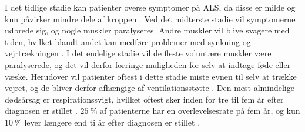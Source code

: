 \noindent
I det tidlige stadie kan patienter overse symptomer på ALS, da disse er milde og kun påvirker mindre dele af kroppen \citep{themusculardystrophyassociation2016}. 
Ved det midterste stadie vil symptomerne udbrede sig, og nogle muskler paralyseres. Andre muskler vil blive svagere med tiden, hvilket blandt andet kan medføre problemer med synkning og vejrtrækningen \citep{themusculardystrophyassociation2016}. I det endelige stadie vil de fleste voluntære muskler være paralyserede, og det vil derfor forringe muligheden for selv at indtage føde eller væske. 
Herudover vil patienter oftest i dette stadie miste evnen til selv at trække vejret, og de bliver derfor afhængige af ventilationsstøtte \citep{themusculardystrophyassociation2016}.
Den mest almindelige dødsårsag er respirationssvigt, hvilket oftest sker inden for tre til fem år efter diagnosen er stillet \citep{morris2015}. $25~\%$ af patienterne har en overlevelsesrate på fem år, og kun $10~\%$ lever længere end ti år efter diagnosen er stillet \citep{grehl2011, miller2005}.


